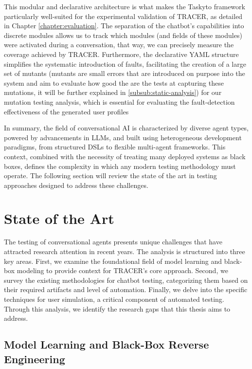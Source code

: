 This modular and declarative architecture
is what makes the Taskyto framework particularly well-suited
for the experimental validation of TRACER,
as detailed in Chapter \ref{chapter:evaluation}.
The separation of the chatbot's capabilities into discrete modules
allows us to track which modules
(and fields of these modules)
were activated during a conversation,
that way, we can precisely measure the coverage
achieved by \ac{TRACER}.
Furthermore, the declarative YAML structure
simplifies the systematic introduction of faults,
facilitating the creation of a large set of mutants
(mutants are small errors that are introduced on purpose into the system
and aim to evaluate how good the are the tests at capturing these mutations,
it will be further explained in
\autoref{subsub:static-analysis})
for our mutation testing analysis,
which is essential for evaluating
the fault-detection effectiveness of the generated user profiles

\indent

In summary,
the field of conversational \ac{AI} is characterized by diverse agent types,
powered by advancements in \acp{LLM},
and built using heterogeneous development paradigms,
from structured \acp{DSL} to flexible multi-agent frameworks.
This context, combined with the necessity of treating many deployed systems as black boxes,
defines the complexity in which any modern testing methodology must operate.
The following section will review the state of the art in testing approaches designed to address these challenges.

\section{State of the Art}\label{sec:sota}

The testing of conversational agents presents unique challenges
that have attracted research attention in recent years.
The analysis is structured into three key areas.
First, we examine the foundational field of model learning
and black-box modeling to provide context for TRACER's core approach.
Second, we survey the existing methodologies for chatbot testing,
categorizing them based on their required artifacts and level of automation.
Finally, we delve into the specific techniques for user simulation,
a critical component of automated testing.
Through this analysis, we identify the research gaps that this thesis aims to address.

\subsection{Model Learning and Black-Box Reverse Engineering}

